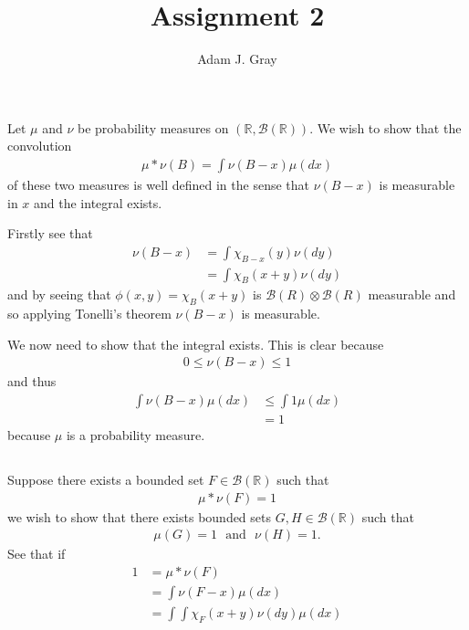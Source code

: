 \documentclass{unswmaths}
\begin{document}
\author{Adam J. Gray}
\title{Assignment 2}
\subject{Measure Theory}

\newcommand{\llra}{\Leftrightarrow}

\unswtitle

\section{}
\subsection{}
Let $ \mu $ and $ \nu $ be probability measures on $ ( \mathbb{R}, \mathcal{B}(\mathbb{R})) $.
We wish to show that the convolution
\begin{align}
	\mu * \nu(B) = \int\nu(B-x)\mu(dx)
\end{align}
of these two measures is well defined in the sense that $ \nu(B - x) $ is measurable in $ x $ and the integral exists.

Firstly see that
\begin{align}
	\nu(B-x) &= \int \chi_{B-x}(y) \nu(dy) \\
		&= \int \chi_{B}(x+y) \nu(dy)
\end{align}
and by seeing that $ \phi(x,y) = \chi_B(x+y) $ is $ \mathcal{B}(R) \otimes \mathcal{B}(R) $ measurable and so applying Tonelli's theorem $ \nu(B - x) $ is measurable.  

We now need to show that the integral exists. This is clear because
\begin{align}
	0 \leq \nu(B - x) \leq 1
\end{align}
and thus
\begin{align}
	\int \nu(B-x) \mu(dx) &\leq \int 1 \mu(dx) \\
		&= 1
\end{align}
because $ \mu $ is a probability measure. 

\subsection{}

Suppose there exists a bounded set $ F \in \mathcal{B}(\mathbb{R}) $ such that 
\begin{align}
	\mu * \nu(F) = 1 
\end{align}
we wish to show that there exists bounded sets $ G, H \in \mathcal{B}(\mathbb{R}) $ such that
\begin{align}
	\mu(G) = 1 \ \ \ \text{and} \ \ \ \nu(H) = 1. 
\end{align}
See that if 
\begin{align}
	1 &= \mu * \nu(F) \\
		&= \int \nu(F-x)\mu(dx) \\
		&= \int\int \chi_F(x+y) \nu(dy) \mu(dx)
\end{align}
\end{document}
